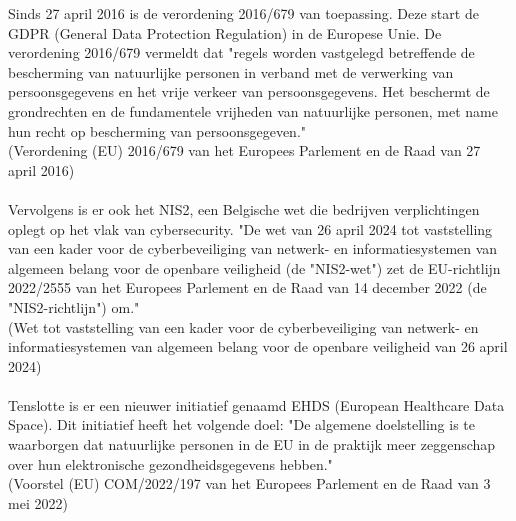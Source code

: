 Sinds 27 april 2016 is de verordening 2016/679 van toepassing. Deze start de GDPR (General Data Protection Regulation) in de Europese Unie. De verordening 2016/679 vermeldt dat "regels worden vastgelegd betreffende de bescherming van natuurlijke personen in verband met de verwerking van persoonsgegevens en het vrije verkeer van persoonsgegevens. Het beschermt de grondrechten en de fundamentele vrijheden van natuurlijke personen, met name hun recht op bescherming van persoonsgegeven."\\ (Verordening (EU) 2016/679 van het Europees Parlement en de Raad van 27 april 2016) %
\\\\
Vervolgens is er ook het NIS2, een Belgische wet die bedrijven verplichtingen oplegt op het vlak van cybersecurity. "De wet van 26 april 2024 tot vaststelling van een kader voor de cyberbeveiliging van netwerk- en informatiesystemen van algemeen belang voor de openbare veiligheid (de "NIS2-wet") zet de EU-richtlijn 2022/2555 van het Europees Parlement en de Raad van 14 december 2022 (de "NIS2-richtlijn") om." \\
(Wet tot vaststelling van een kader voor de cyberbeveiliging van netwerk- en informatiesystemen van algemeen belang voor de openbare veiligheid van 26 april 2024) %
\\\\
Tenslotte is er een nieuwer initiatief genaamd EHDS (European Healthcare Data Space). Dit initiatief heeft het volgende doel: "De algemene doelstelling is te waarborgen dat natuurlijke personen in de EU in de praktijk meer zeggenschap over hun elektronische gezondheidsgegevens hebben."\\ (Voorstel (EU) COM/2022/197 van het Europees Parlement en de Raad van 3 mei 2022) %
